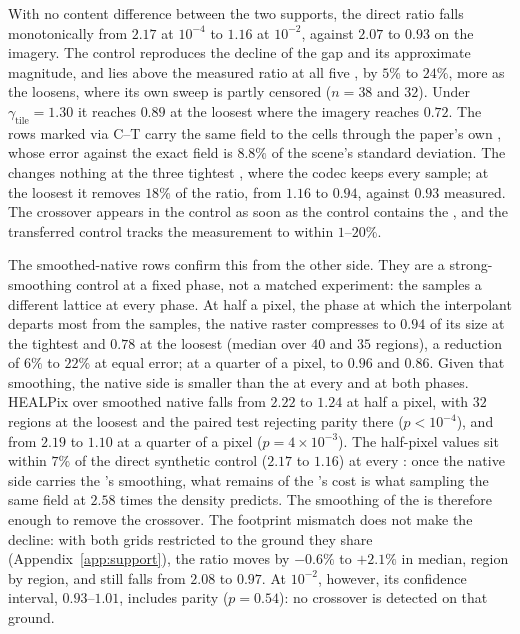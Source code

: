 With no content difference between the two supports, the direct ratio
falls monotonically from $2.17$ at $10^{-4}$ to $1.16$ at $10^{-2}$,
against $2.07$ to $0.93$ on the imagery. The control reproduces the
decline of the gap and its approximate magnitude, and lies above the
measured ratio at all five , by $5\%$ to $24\%$, more as
the  loosens, where its own sweep is partly censored
($n=38$ and $32$). Under $\gamma_{\mathrm{tile}}=1.30$ it reaches $0.89$
at the loosest  where the imagery reaches $0.72$. The rows
marked via C--T carry the same field to the cells through the paper's
own , whose error against the exact field is $8.8\%$ of
the scene's standard deviation. The  changes nothing at
the three tightest , where the codec keeps every sample; at
the loosest it removes $18\%$ of the ratio, from $1.16$ to $0.94$,
against $0.93$ measured. The crossover appears in the control as soon as
the control contains the , and the transferred control
tracks the measurement to within $1$--$20\%$.

The smoothed-native rows confirm this from the other side. They are a
strong-smoothing control at a fixed phase, not a matched experiment:
the  samples a different lattice at every phase. At half a
pixel, the phase at which the interpolant departs most from the samples,
the native raster compresses to $0.94$ of its size at the tightest
 and $0.78$ at the loosest (median over $40$ and $35$
regions), a reduction of $6\%$ to $22\%$ at equal error; at a quarter of
a pixel, to $0.96$ and $0.86$. Given that smoothing, the native side is
smaller than the  at every  and at both
phases. HEALPix over smoothed native falls from $2.22$ to $1.24$ at half
a pixel, with $32$ regions at the loosest  and the paired
test rejecting parity there ($p<10^{-4}$), and from $2.19$ to $1.10$ at
a quarter of a pixel ($p=4\times10^{-3}$). The half-pixel values sit
within $7\%$ of the direct synthetic control ($2.17$ to $1.16$) at every
: once the native side carries the 's
smoothing, what remains of the 's cost is what sampling
the same field at $2.58$ times the density predicts.  The
smoothing of the  is therefore enough to remove the
crossover. The footprint mismatch does not make the  decline:
with both grids restricted to the ground they share
(Appendix~\ref{app:support}), the ratio moves by $-0.6\%$ to $+2.1\%$ in
median, region by region, and still falls from $2.08$ to $0.97$. At
$10^{-2}$, however, its confidence interval,
$0.93$--$1.01$, includes parity ($p=0.54$): no crossover is detected
on that ground.
